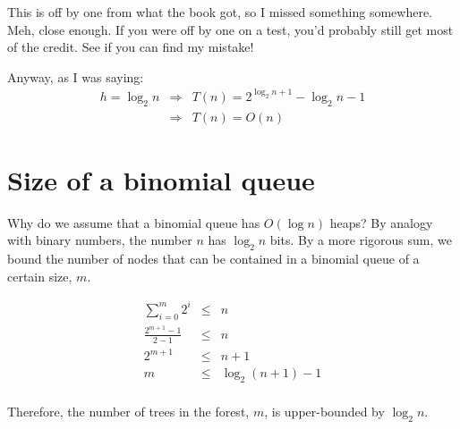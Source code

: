 \documentclass{article}[10pt,letterpaper]
\begin{document}
This is off by one from what the book got, so I missed something somewhere.
Meh, close enough. If you were off by one on a test, you'd probably
still get most of the credit. See if you can find my mistake!

Anyway, as I was saying:
\begin{eqnarray}
h = \log_2{n} & \Rightarrow & T(n) = 2^{\log_2{n} + 1} - \log_2{n} - 1\\
              & \Rightarrow & T(n) = O(n)
\end{eqnarray}

\section{Size of a binomial queue}

Why do we assume that a binomial queue has $O(\log{n})$ heaps?
By analogy with binary numbers, the number $n$ has $\log_2{n}$ bits.
By a more rigorous sum, we bound the number of nodes that can be
contained in a binomial queue of a certain size, $m$.

\begin{eqnarray}
\sum_{i=0}^{m} 2^i & \le & n\\
\frac{2^{m+1} - 1}{2-1} & \le & n\\
2^{m+1} & \le & n+1\\
m & \le & \log_2{(n+1)} - 1\\
\end{eqnarray}

Therefore, the number of trees in the forest, $m$, is upper-bounded by
$\log_2{n}$.
\end{document}
